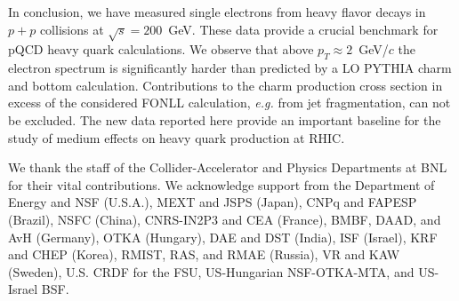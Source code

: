 \documentclass[aps,prl,superscriptaddress,showpacs,floatfix,twocolumn]{revtex4}
\begin{document}
In conclusion, we have measured single electrons from heavy flavor decays
in $p + p$ collisions at $\sqrt{s} = 200$~GeV. 
These data provide a crucial benchmark for pQCD heavy quark calculations. 
We observe that above $p_T \approx 2$~GeV/$c$ the electron spectrum is 
significantly harder than predicted by a LO PYTHIA charm and bottom 
calculation. 
Contributions to the charm production cross section in excess of the considered
FONLL calculation, {\it e.g.} from jet fragmentation, can not be excluded.
The new data reported here provide an important baseline
for the study of medium effects on heavy quark production at RHIC.


We thank the staff of the Collider-Accelerator and Physics
Departments at BNL for their vital contributions.  We acknowledge
support from the Department of Energy and NSF (U.S.A.), 
MEXT and JSPS (Japan), CNPq and FAPESP (Brazil), NSFC (China), 
CNRS-IN2P3 and CEA (France), 
BMBF, DAAD, and AvH (Germany), 
OTKA (Hungary), DAE and DST (India), ISF (Israel), 
KRF and CHEP (Korea), RMIST, RAS, and RMAE (Russia), 
VR and KAW (Sweden), U.S. CRDF for the FSU, 
US-Hungarian NSF-OTKA-MTA, and US-Israel BSF.

\def\IJMPA{{Int. J. Mod. Phys.}~{\bf A}}
\def\JPG{{J. Phys}~{\bf G}}
\def\NCA{Nuovo Cimento}
\def\NIM{Nucl. Instrum. Methods}
\def\NIMA{{Nucl. Instrum. Methods}~{\bf A}}
\def\NPA{{Nucl. Phys.}~{\bf A}}
\def\NPB{{Nucl. Phys.}~{\bf B}}
\def\PLB{Phys. Lett. B}
\def\PLC{Phys. Repts.\ }
\def\PRL{Phys. Rev. Lett.\ }
\def\PRD{Phys. Rev. D}
\def\PRC{Phys. Rev. C}
\def\ZPC{{Z. Phys.}~{\bf C}}
\def\etal{{\it et al.} }
\end{document}
